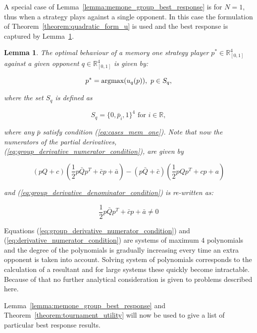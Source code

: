 \documentclass[10pt]{article}
\newcommand{\R}{\mathbb{R}}
\newtheorem{lemma}[theorem]{Lemma}
\begin{document}
A special case of Lemma~\ref{lemma:memone_group_best_response} is for \(N=1\),
thus when a strategy plays against a single opponent. In this case the formulation
of Theorem~\ref{theorem:quadratic_form_u} is used and the best response is captured
by Lemma~\ref{lemma:memone_best_response}.

\begin{lemma}\label{lemma:memone_best_response}
    The optimal behaviour of a memory one strategy player \(p^* \in \R_{[0, 1]} ^ 4\)
    against a given opponent \(q \in \R_{[0, 1]} ^ 4\) is given by:
    
    \[p^* = \textnormal{argmax}(u_q(p)), \ p \in S_q,\]
    
    where the set \(S_q\) is defined as 
    
    \[S_q = \{0, \bar{p}_i, 1 \}^4 \text{ for } i \in \R,\]
    
    where any \(\bar{p}\) satisfy condition (\ref{eq:cases_mem_one}). Note that now
    the numerators of the partial derivatives, (\ref{eq:group_derivative_numerator_condition}),
    are given by
    
    {\small
    \begin{equation}\label{eq:derivative_numerator_condition}
        (pQ + c) ( \frac{1}{2} p  \bar{Q}  p^T + \bar{c}  p + \bar{a}) 
        - (p\bar{Q} + \bar{c})( \frac{1}{2} p  Q  p^T + c p + a)
    \end{equation}}

    and (\ref{eq:group_derivative_denominator_condition}) is re-written as:

    {\small
    \begin{equation}\label{eq:derivative_denominator_condition}
        \frac{1}{2} p  \bar{Q}  p^T + \bar{c}  p + \bar{a} \neq 0
    \end{equation}}
\end{lemma}

Equations (\ref{eq:group_derivative_numerator_condition}) and (\ref{eq:derivative_numerator_condition})
are systems of maximum \(4\) polynomials and the degree of the polynomials is gradually increasing
every time an extra opponent is taken into account. Solving system of polynomials corresponds
to the calculation of a resultant and for large systems these quickly become intractable.
Because of that no further analytical consideration is given to problems described
here.

Lemma~\ref{lemma:memone_group_best_response} and Theorem~\ref{theorem:tournament_utility}
will now be used to give a list of particular best response results.
\end{document}
